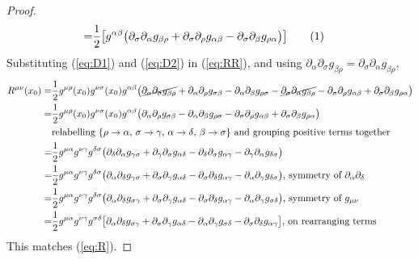 \documentclass[]{article}
\newcommand\numberthis{\addtocounter{equation}{1}\tag{\theequation}}
\begin{document}
\begin{proof}
\begin{align*}
	 =& \frac{1}{2}\big[g^{\alpha\beta}\big(\partial_{\sigma}\partial_{\alpha}g_{\beta\rho} + \partial_{\sigma}\partial_{\rho}g_{\alpha\beta} - \partial_{\sigma}\partial_{\beta}g_{\rho\alpha}\big)\big] \numberthis\label{eq:D2}
	\end{align*}
	Substituting (\ref{eq:D1}) and (\ref{eq:D2}) in (\ref{eq:RR}), and using $\partial_{\alpha}\partial_{\sigma}g_{\beta\rho}=\partial_{\sigma}\partial_{\alpha}g_{\beta\rho},$
	\begin{align*}
	R^{\mu\nu}(x_0)=& \frac{1}{2} g^{\mu\rho}(x_0)g^{\nu\sigma}(x_0)g^{\alpha\beta}\big(\cancel{\partial_{\alpha}\partial_{\sigma}g_{\beta\rho}} + \partial_{\alpha}\partial_{\rho} g_{\sigma\beta} - \partial_{\alpha}\partial_{\beta}g_{\rho\sigma} - \cancel{\partial_{\sigma}\partial_{\alpha}g_{\beta\rho}} - \partial_{\sigma}\partial_{\rho}g_{\alpha\beta} + \partial_{\sigma}\partial_{\beta}g_{\rho\alpha}\big)\\
	=& \frac{1}{2} g^{\mu\rho}(x_0)g^{\nu\sigma}(x_0)g^{\alpha\beta}\big( \partial_{\alpha}\partial_{\rho} g_{\sigma\beta} - \partial_{\alpha}\partial_{\beta}g_{\rho\sigma}  - \partial_{\sigma}\partial_{\rho}g_{\alpha\beta} + \partial_{\sigma}\partial_{\beta}g_{\rho\alpha}\big)\\
	&\text{relabelling } \{\rho\rightarrow \alpha \text{, } \sigma\rightarrow\gamma \text{, } \alpha\rightarrow\delta\text{, } \beta\rightarrow\sigma\} \text{ and grouping positive terms together}\\
	=& \frac{1}{2} g^{\mu\alpha}g^{\nu\gamma}g^{\delta\sigma} \big( \partial_{\delta}\partial_{\alpha}g_{\gamma\sigma} + \partial_{\gamma}\partial_{\sigma}g_{\alpha\delta} - \partial_{\delta}\partial_{\sigma}g_{\alpha\gamma} - \partial_{\gamma}\partial_{\alpha}g_{\delta\sigma}\big)\\
	=& \frac{1}{2} g^{\mu\alpha}g^{\nu\gamma}g^{\delta\sigma} \big( \partial_{\alpha}\partial_{\delta}g_{\gamma\sigma} + \partial_{\sigma}\partial_{\gamma}g_{\alpha\delta} - \partial_{\sigma}\partial_{\delta}g_{\alpha\gamma} - \partial_{\alpha}\partial_{\gamma}g_{\delta\sigma}\big) \text{, symmetry of $\partial_{\alpha}\partial_{\delta}$} \\
	=& \frac{1}{2} g^{\mu\alpha}g^{\nu\gamma}g^{\delta\sigma} \big( \partial_{\alpha}\partial_{\delta}g_{\sigma\gamma} + \partial_{\sigma}\partial_{\gamma}g_{\alpha\delta} - \partial_{\sigma}\partial_{\delta}g_{\alpha\gamma} - \partial_{\alpha}\partial_{\gamma}g_{\sigma\delta}\big) \text {, symmetry of $g_{\mu\nu}$}\\
	= & \frac{1}{2}g^{\mu\alpha}g^{\nu\gamma}g^{\sigma\delta}\big[\partial_{\alpha}\partial_{\delta}g_{\sigma\gamma} + \partial_{\sigma}\partial_{\gamma}g_{\alpha\delta} - \partial_{\alpha}\partial_{\gamma}g_{\sigma\delta} - \partial_{\sigma}\partial_{\delta}g_{\alpha\gamma}\big] \text{, on rearranging terms}\\
	\end{align*}
	This matches (\ref{eq:R}).
	

\end{proof}
\end{document}
